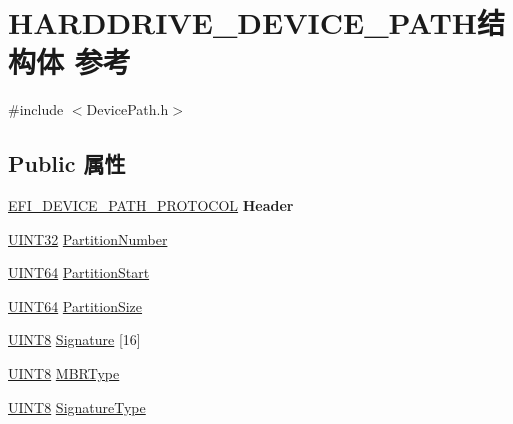 \hypertarget{struct_h_a_r_d_d_r_i_v_e___d_e_v_i_c_e___p_a_t_h}{}\section{H\+A\+R\+D\+D\+R\+I\+V\+E\+\_\+\+D\+E\+V\+I\+C\+E\+\_\+\+P\+A\+T\+H结构体 参考}
\label{struct_h_a_r_d_d_r_i_v_e___d_e_v_i_c_e___p_a_t_h}


{\ttfamily \#include $<$Device\+Path.\+h$>$}

\subsection*{Public 属性}
\begin{DoxyCompactItemize}
\item 
\mbox{\label{struct_h_a_r_d_d_r_i_v_e___d_e_v_i_c_e___p_a_t_h_ad9dc727049ff1f69ca2f61387ca1de7e}} 
\hyperlink{struct_e_f_i___d_e_v_i_c_e___p_a_t_h___p_r_o_t_o_c_o_l}{E\+F\+I\+\_\+\+D\+E\+V\+I\+C\+E\+\_\+\+P\+A\+T\+H\+\_\+\+P\+R\+O\+T\+O\+C\+OL} {\bfseries Header}
\item 
\hyperlink{_processor_bind_8h_ae1e6edbbc26d6fbc71a90190d0266018}{U\+I\+N\+T32} \hyperlink{struct_h_a_r_d_d_r_i_v_e___d_e_v_i_c_e___p_a_t_h_adae14bc4207c041edc49f7b9ddc3c6ab}{Partition\+Number}
\item 
\hyperlink{_processor_bind_8h_a57be03562867144161c1bfee95ca8f7c}{U\+I\+N\+T64} \hyperlink{struct_h_a_r_d_d_r_i_v_e___d_e_v_i_c_e___p_a_t_h_aae952746bd82e8ff07a7f8e85e98379f}{Partition\+Start}
\item 
\hyperlink{_processor_bind_8h_a57be03562867144161c1bfee95ca8f7c}{U\+I\+N\+T64} \hyperlink{struct_h_a_r_d_d_r_i_v_e___d_e_v_i_c_e___p_a_t_h_a0d91e309d47f89c5d818b2732b564077}{Partition\+Size}
\item 
\hyperlink{_processor_bind_8h_ab27e9918b538ce9d8ca692479b375b6a}{U\+I\+N\+T8} \hyperlink{struct_h_a_r_d_d_r_i_v_e___d_e_v_i_c_e___p_a_t_h_a2bba923be8dba036f7eb9c4343fb986b}{Signature} \mbox{[}16\mbox{]}
\item 
\hyperlink{_processor_bind_8h_ab27e9918b538ce9d8ca692479b375b6a}{U\+I\+N\+T8} \hyperlink{struct_h_a_r_d_d_r_i_v_e___d_e_v_i_c_e___p_a_t_h_ad6ed2b3c4e2c6b9adce67e8bb53a6e94}{M\+B\+R\+Type}
\item 
\hyperlink{_processor_bind_8h_ab27e9918b538ce9d8ca692479b375b6a}{U\+I\+N\+T8} \hyperlink{struct_h_a_r_d_d_r_i_v_e___d_e_v_i_c_e___p_a_t_h_a5e46fea12f2a9434c43fe886cad83231}{Signature\+Type}
\end{DoxyCompactItemize}


